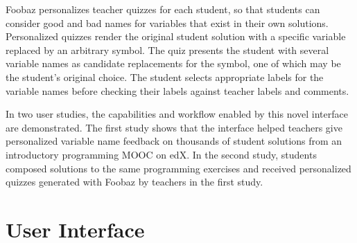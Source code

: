 Foobaz personalizes teacher quizzes for each student, so that students can consider good and bad names for variables that exist in their own solutions. Personalized quizzes render the original student solution with a specific variable replaced by an arbitrary symbol. The quiz presents the student with several variable names as candidate replacements for the symbol, one of which may be the student's original choice. The student selects appropriate labels for the variable names before checking their labels against teacher labels and comments.

In two user studies, the capabilities and workflow enabled by this novel interface are demonstrated. The first study shows that the interface helped teachers give personalized variable name feedback on thousands of student solutions from an introductory programming MOOC on edX. In the second study, students composed solutions to the same programming exercises and received personalized quizzes generated with Foobaz by teachers in the first study.


\section{User Interface}

